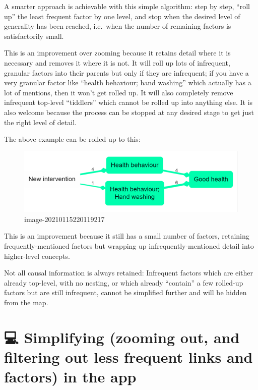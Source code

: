 \documentclass[
]{book}
\begin{document}
A smarter approach is achievable with this simple algorithm: step by step, ``roll up'' the least frequent factor by one level, and stop when the desired level of generality has been reached, i.e.~when the number of remaining factors is satisfactorily small.

This is an improvement over zooming because it retains detail where it is necessary and removes it where it is not. It will roll up lots of infrequent, granular factors into their parents but only if they are infrequent; if you have a very granular factor like ``health behaviour; hand washing'' which actually has a lot of mentions, then it won't get rolled up. It will also completely remove infrequent top-level ``tiddlers'' which cannot be rolled up into anything else. It is also welcome because the process can be stopped at any desired stage to get just the right level of detail.

The above example can be rolled up to this:

\begin{figure}
\centering
\includegraphics{_assets/image-20210115220119217.png}
\caption{image-20210115220119217}
\end{figure}

This is an improvement because it still has a small number of factors, retaining frequently-mentioned factors but wrapping up infrequently-mentioned detail into higher-level concepts.

Not all causal information is always retained: Infrequent factors which are either already top-level, with no nesting, or which already ``contain'' a few rolled-up factors but are still infrequent, cannot be simplified further and will be hidden from the map.

\hypertarget{simplifying-zooming-out-and-filtering-out-less-frequent-links-and-factors-in-the-app}{%
\chapter{💻 Simplifying (zooming out, and filtering out less frequent links and factors) in the app}\label{simplifying-zooming-out-and-filtering-out-less-frequent-links-and-factors-in-the-app}}
\end{document}
